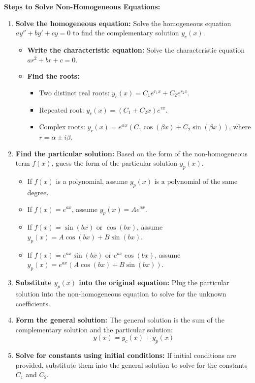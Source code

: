 \documentclass[10pt]{article}
\begin{document}
\textbf{Steps to Solve Non-Homogeneous Equations:}
\begin{enumerate}
    \item \textbf{Solve the homogeneous equation:} Solve the homogeneous equation \( ay'' + by' + cy = 0 \) to find the complementary solution \( y_c(x) \).
    \begin{itemize}
        \item \textbf{Write the characteristic equation:} Solve the characteristic equation \( ar^2 + br + c = 0 \).
        \item \textbf{Find the roots:}
        \begin{itemize}
            \item Two distinct real roots: \( y_c(x) = C_1 e^{r_1 x} + C_2 e^{r_2 x} \).
            \item Repeated root: \( y_c(x) = (C_1 + C_2 x) e^{r x} \).
            \item Complex roots: \( y_c(x) = e^{\alpha x}(C_1 \cos(\beta x) + C_2 \sin(\beta x)) \), where \( r = \alpha \pm i\beta \).
        \end{itemize}
    \end{itemize}
    
    \item \textbf{Find the particular solution:} Based on the form of the non-homogeneous term \( f(x) \), guess the form of the particular solution \( y_p(x) \).
    \begin{itemize}
        \item If \( f(x) \) is a polynomial, assume \( y_p(x) \) is a polynomial of the same degree.
        \item If \( f(x) = e^{ax} \), assume \( y_p(x) = A e^{ax} \).
        \item If \( f(x) = \sin(bx) \) or \( \cos(bx) \), assume \( y_p(x) = A \cos(bx) + B \sin(bx) \).
        \item If \( f(x) = e^{ax} \sin(bx) \) or \( e^{ax} \cos(bx) \), assume \( y_p(x) = e^{ax} \left( A \cos(bx) + B \sin(bx) \right) \).
    \end{itemize}

    \item \textbf{Substitute \( y_p(x) \) into the original equation:} Plug the particular solution into the non-homogeneous equation to solve for the unknown coefficients.

    \item \textbf{Form the general solution:} The general solution is the sum of the complementary solution and the particular solution:
    \[
    y(x) = y_c(x) + y_p(x)
    \]

    \item \textbf{Solve for constants using initial conditions:} If initial conditions are provided, substitute them into the general solution to solve for the constants \( C_1 \) and \( C_2 \).
\end{enumerate}
\end{document}
